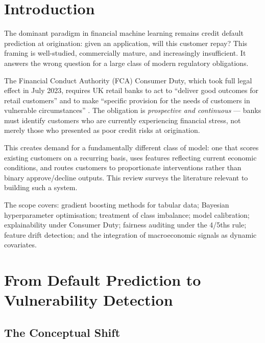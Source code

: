 \documentclass[12pt, a4paper]{article}
\begin{document}
\tableofcontents
\newpage

\section{Introduction}

The dominant paradigm in financial machine learning remains credit default prediction
at origination: given an application, will this customer repay?
This framing is well-studied, commercially mature, and increasingly insufficient.
It answers the wrong question for a large class of modern regulatory obligations.

The Financial Conduct Authority (FCA) Consumer Duty, which took full legal effect
in July 2023, requires UK retail banks to act to ``deliver good outcomes for
retail customers'' and to make ``specific provision for the needs of customers in
vulnerable circumstances'' \cite{fca2023duty}.
The obligation is \emph{prospective and continuous} --- banks must identify customers
who are currently experiencing financial stress, not merely those who presented
as poor credit risks at origination.

This creates demand for a fundamentally different class of model: one that scores
existing customers on a recurring basis, uses features reflecting current economic
conditions, and routes customers to proportionate interventions rather than
binary approve/decline outputs.
This review surveys the literature relevant to building such a system.

The scope covers: gradient boosting methods for tabular data; Bayesian hyperparameter
optimisation; treatment of class imbalance; model calibration; explainability under
Consumer Duty; fairness auditing under the 4/5ths rule; feature drift detection;
and the integration of macroeconomic signals as dynamic covariates.

\section{From Default Prediction to Vulnerability Detection}

\subsection{The Conceptual Shift}
\end{document}
